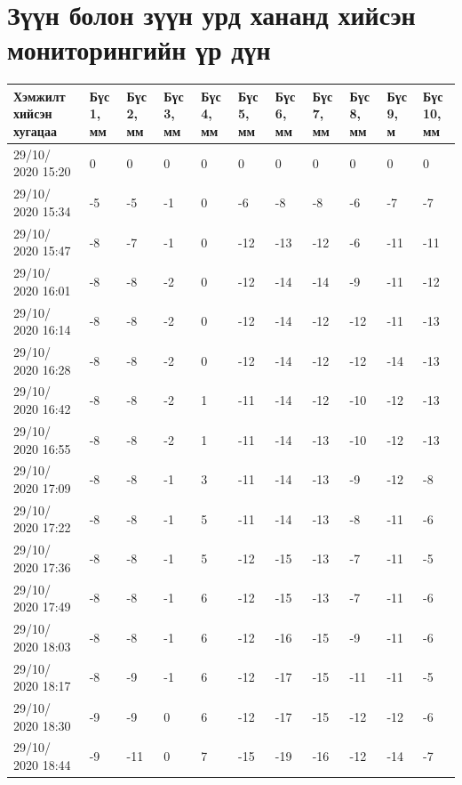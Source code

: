 
\chapter{Зүүн болон зүүн урд хананд хийсэн мониторингийн үр дүн} %

\label{AppendixA} %
\pagecolor{white}
\begin{table}[h]
    \centering
    \begin{tabular}{|p{1.5cm}|p{0.8cm}|p{0.8cm}|p{0.8cm}|p{0.8cm}|p{0.8cm}|p{0.8cm}|p{0.8cm}|p{0.8cm}|p{0.8cm}|p{0.8cm}|}
         \hline
     Хэмжилт хийсэн хугацаа & Бүс 1, мм&	Бүс 2, мм&	Бүс 3, мм&	Бүс 4, мм&	Бүс 5, мм&	Бүс 6, мм&	Бүс 7, мм&	Бүс 8, мм&	Бүс 9, м&	Бүс 10, мм\\ \hline
     29/10/ 2020 15:20&	0&	0&	0&	0&	0&	0&	0&	0&	0&	0 \\ \hline
    29/10/ 2020 15:34&	-5&	-5&	-1&	0&	-6&	-8&	-8&	-6&	-7&	-7\\ \hline
    29/10/ 2020 15:47&	-8&	-7&	-1&	0&	-12&	-13&	-12&	-6&	-11&	-11\\ \hline
    29/10/ 2020 16:01&	-8&	-8&	-2&	0&	-12&	-14&	-14&	-9&	-11&	-12\\ \hline
    29/10/ 2020 16:14&	-8&	-8&	-2&	0&	-12&	-14&	-12&	-12&	-11&	-13\\ \hline
    29/10/ 2020 16:28&	-8&	-8&	-2&	0&	-12&	-14&	-12&	-12&	-14&	-13\\ \hline
    29/10/ 2020 16:42&	-8&	-8&	-2&	1&	-11&	-14&	-12&	-10&	-12&	-13\\ \hline
    29/10/ 2020 16:55&	-8&	-8&	-2&	1&	-11&	-14&	-13&	-10&	-12&	-13\\ \hline
    29/10/ 2020 17:09&	-8&	-8&	-1&	3&	-11&	-14&	-13&	-9&	-12&	-8\\ \hline
    29/10/ 2020 17:22&	-8&	-8&	-1&	5&	-11&	-14&	-13&	-8&	-11&	-6\\ \hline
    29/10/ 2020 17:36&	-8&	-8&	-1&	5&	-12&	-15&	-13&	-7&	-11&	-5\\ \hline
    29/10/ 2020 17:49&	-8&	-8&	-1&	6&	-12&	-15&	-13&	-7&	-11&	-6\\ \hline
29/10/ 2020 18:03&	-8&	-8&	-1&	6&	-12&	-16&	-15&	-9&	-11&	-6\\ \hline
29/10/ 2020 18:17&	-8&	-9&	-1&	6&	-12&	-17&	-15&	-11&	-11&	-5\\ \hline
29/10/ 2020 18:30&	-9&	-9&	0&	6&	-12&	-17&	-15&	-12&	-12&	-6\\ \hline
29/10/ 2020 18:44&	-9&	-11&	0&	7&	-15&	-19&	-16&	-12&	-14&	-7\\ \hline
    \end{tabular}
\end{table}
